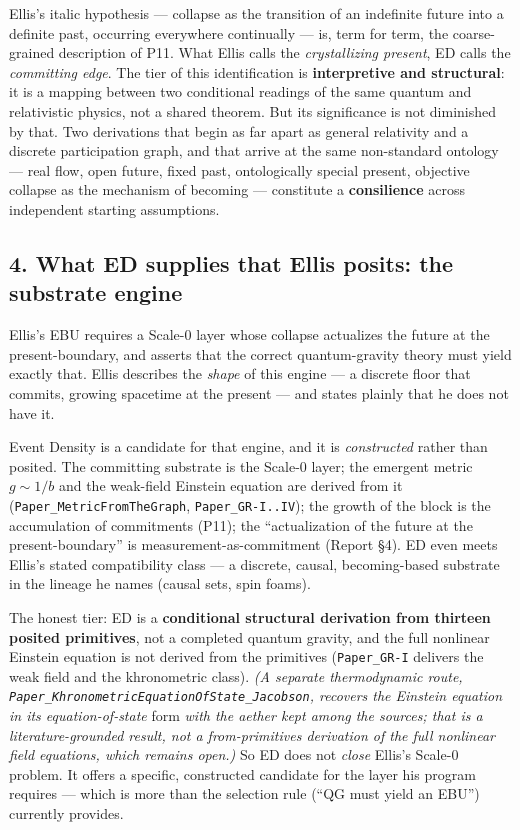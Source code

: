 \documentclass[
  11pt,
]{article}
\begin{document}
Ellis's italic hypothesis --- collapse as the transition of an
indefinite future into a definite past, occurring everywhere continually
--- is, term for term, the coarse-grained description of P11. What Ellis
calls the \emph{crystallizing present}, ED calls the \emph{committing
edge}. The tier of this identification is \textbf{interpretive and
structural}: it is a mapping between two conditional readings of the
same quantum and relativistic physics, not a shared theorem. But its
significance is not diminished by that. Two derivations that begin as
far apart as general relativity and a discrete participation graph, and
that arrive at the same non-standard ontology --- real flow, open
future, fixed past, ontologically special present, objective collapse as
the mechanism of becoming --- constitute a \textbf{consilience} across
independent starting assumptions.

\subsection{4. What ED supplies that Ellis posits: the substrate
engine}\label{what-ed-supplies-that-ellis-posits-the-substrate-engine}

Ellis's EBU requires a Scale-0 layer whose collapse actualizes the
future at the present-boundary, and asserts that the correct
quantum-gravity theory must yield exactly that. Ellis describes the
\emph{shape} of this engine --- a discrete floor that commits, growing
spacetime at the present --- and states plainly that he does not have
it.

Event Density is a candidate for that engine, and it is
\emph{constructed} rather than posited. The committing substrate is the
Scale-0 layer; the emergent metric \(g \sim 1/b\) and the weak-field
Einstein equation are derived from it
(\texttt{Paper\_MetricFromTheGraph}, \texttt{Paper\_GR-I..IV}); the
growth of the block is the accumulation of commitments (P11); the
``actualization of the future at the present-boundary'' is
measurement-as-commitment (Report §4). ED even meets Ellis's stated
compatibility class --- a discrete, causal, becoming-based substrate in
the lineage he names (causal sets, spin foams).

The honest tier: ED is a \textbf{conditional structural derivation from
thirteen posited primitives}, not a completed quantum gravity, and the
full nonlinear Einstein equation is not derived from the primitives
(\texttt{Paper\_GR-I} delivers the weak field and the khronometric
class). \emph{(A separate thermodynamic route,
\texttt{Paper\_KhronometricEquationOfState\_Jacobson}, recovers the
Einstein equation in its equation-of-state} form \emph{with the aether
kept among the sources; that is a literature-grounded result, not a
from-primitives derivation of the full nonlinear field equations, which
remains open.)} So ED does not \emph{close} Ellis's Scale-0 problem. It
offers a specific, constructed candidate for the layer his program
requires --- which is more than the selection rule (``QG must yield an
EBU'') currently provides.
\end{document}
